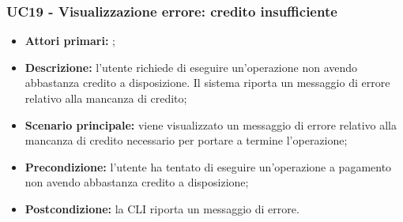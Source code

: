 \subsubsection{UC19 - Visualizzazione errore: credito insufficiente}
\begin{itemize}
	\item \textbf{Attori primari:} \us{};
	\item \textbf{Descrizione:} l’utente richiede di eseguire un’operazione non avendo abbastanza credito a disposizione. Il sistema riporta un messaggio di errore relativo alla mancanza di credito; 
	\item \textbf{Scenario principale:} viene visualizzato un messaggio di errore relativo alla mancanza di credito necessario per portare a termine l’operazione;
	\item \textbf{Precondizione:} l’utente ha tentato di eseguire un’operazione a pagamento non avendo abbastanza credito a disposizione;  
	\item \textbf{Postcondizione:} la CLI riporta un messaggio di errore. 
\end{itemize}